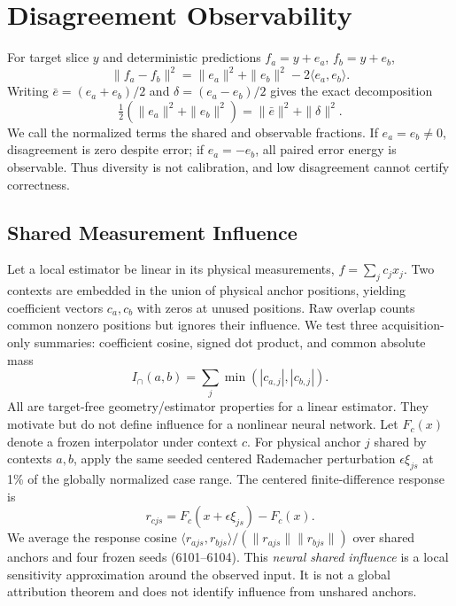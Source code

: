 \documentclass[10pt,twocolumn,letterpaper]{article}
\begin{document}
\section{Disagreement Observability}
For target slice $y$ and deterministic predictions $f_a=y+e_a$, $f_b=y+e_b$,
\begin{equation}
\|f_a-f_b\|^2=\|e_a\|^2+\|e_b\|^2-2\langle e_a,e_b\rangle. \label{eq:diff}
\end{equation}
Writing $\bar e=(e_a+e_b)/2$ and $\delta=(e_a-e_b)/2$ gives the exact decomposition
\begin{equation}
\tfrac12(\|e_a\|^2+\|e_b\|^2)=\|\bar e\|^2+\|\delta\|^2. \label{eq:decomp}
\end{equation}
We call the normalized terms the shared and observable fractions. If $e_a=e_b\ne0$, disagreement is zero despite error; if $e_a=-e_b$, all paired error energy is observable. Thus diversity is not calibration, and low disagreement cannot certify correctness.

\subsection{Shared Measurement Influence}
Let a local estimator be linear in its physical measurements, $f=\sum_j c_j x_j$. Two contexts are embedded in the union of physical anchor positions, yielding coefficient vectors $c_a,c_b$ with zeros at unused positions. Raw overlap counts common nonzero positions but ignores their influence. We test three acquisition-only summaries: coefficient cosine, signed dot product, and common absolute mass
\begin{equation}
I_{\cap}(a,b)=\sum_j\min(|c_{a,j}|,|c_{b,j}|). \label{eq:influence}
\end{equation}
All are target-free geometry/estimator properties for a linear estimator. They motivate but do not define influence for a nonlinear neural network. Let $F_c(x)$ denote a frozen interpolator under context $c$. For physical anchor $j$ shared by contexts $a,b$, apply the same seeded centered Rademacher perturbation $\epsilon\xi_{js}$ at 1\% of the globally normalized case range. The centered finite-difference response is
\begin{equation}
r_{cjs}=F_c(x+\epsilon\xi_{js})-F_c(x).
\end{equation}
We average the response cosine $\langle r_{ajs},r_{bjs}\rangle/(\|r_{ajs}\|\|r_{bjs}\|)$ over shared anchors and four frozen seeds (6101--6104). This \emph{neural shared influence} is a local sensitivity approximation around the observed input. It is not a global attribution theorem and does not identify influence from unshared anchors.
\end{document}
